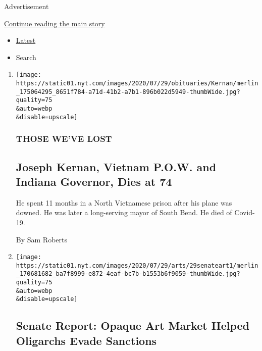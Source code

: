 Advertisement

\protect\hyperlink{after-mid1}{Continue reading the main story}

\begin{itemize}
\tightlist
\item
  \protect\hyperlink{stream-panel}{Latest}
\item
  Search
\end{itemize}

\begin{enumerate}
\def\labelenumi{\arabic{enumi}.}
\item
  \href{/2020/07/29/us/politics/joseph-kernan-dead-coronavirus.html}{}

  \texttt{[image: https://static01.nyt.com/images/2020/07/29/obituaries/Kernan/merlin\_175064295\_8651f784-a71d-41b2-a7b1-896b022d5949-thumbWide.jpg?quality=75\\\&auto=webp\\\&disable=upscale]}

  \hypertarget{those-weve-lost}{%
  \subsubsection{THOSE WE'VE LOST}\label{those-weve-lost}}

  \hypertarget{joseph-kernan-vietnam-pow-and-indiana-governor-dies-at-74}{%
  \subsection{Joseph Kernan, Vietnam P.O.W. and Indiana Governor, Dies
  at
  74}\label{joseph-kernan-vietnam-pow-and-indiana-governor-dies-at-74}}

  He spent 11 months in a North Vietnamese prison after his plane was
  downed. He was later a long-serving mayor of South Bend. He died of
  Covid-19.

  By Sam Roberts
\item
  \href{/2020/07/29/arts/design/senate-report-art-market-russia-oligarchs-sanctions.html}{}

  \texttt{[image: https://static01.nyt.com/images/2020/07/29/arts/29senateart1/merlin\_170681682\_ba7f8999-e872-4eaf-bc7b-b1553b6f9059-thumbWide.jpg?quality=75\\\&auto=webp\\\&disable=upscale]}

  \hypertarget{senate-report-opaque-art-market-helped-oligarchs-evade-sanctions}{%
  \subsection{Senate Report: Opaque Art Market Helped Oligarchs Evade
  Sanctions}\label{senate-report-opaque-art-market-helped-oligarchs-evade-sanctions}}


\end{enumerate}
